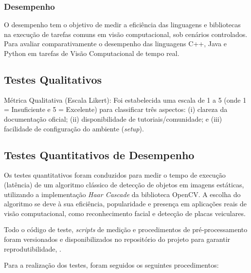 \subsubsection{Desempenho}
O desempenho tem o objetivo de medir a eficiência das linguagens e bibliotecas na execução de tarefas comuns em visão computacional, sob cenários controlados. Para avaliar comparativamente o desempenho das linguagens C++, Java e Python em tarefas de Visão Computacional de tempo real.

\subsection{Testes Qualitativos}

Métrica Qualitativa (Escala Likert): Foi estabelecida uma escala de 1 a 5 (onde 1 = Insuficiente e 5 = Excelente) para classificar três aspectos: (i) clareza da documentação oficial; (ii) disponibilidade de tutoriais/comunidade; e (iii) facilidade de configuração do ambiente (\textit{setup}).

\subsection{Testes Quantitativos de Desempenho}
Os testes quantitativos foram conduzidos para medir o tempo de execução (latência) de um algoritmo clássico de detecção de objetos em imagens estáticas, utilizando a implementação \textit{Haar Cascade} da biblioteca OpenCV. A escolha do algoritmo se deve à sua eficiência, popularidade e presença em aplicações reais de visão computacional, como reconhecimento facial e detecção de placas veiculares.

Todo o código de teste, \textit{scripts} de medição e procedimentos de pré‑processamento foram versionados e disponibilizados no repositório do projeto para garantir reprodutibilidade, \citep{atomOrgGithub}.

Para a realização dos testes, foram seguidos os seguintes procedimentos:

